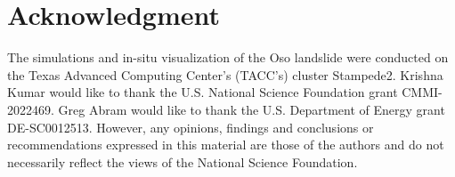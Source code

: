 \documentclass[journal]{IEEEtran}
\begin{document}
\appendices

\section*{Acknowledgment}
The simulations and in-situ visualization of the Oso landslide were conducted on the Texas Advanced Computing Center’s (TACC’s) cluster Stampede2.  Krishna Kumar would like to thank the U.S. National Science Foundation grant CMMI-2022469. Greg Abram would like to thank the U.S. Department of Energy grant DE-SC0012513. However, any opinions, 
findings and conclusions or recommendations expressed in this material are those of the authors and do not necessarily reflect the views of the National Science Foundation.

\ifCLASSOPTIONcaptionsoff
  \newpage
\fi





%
%

% 




\end{document}

